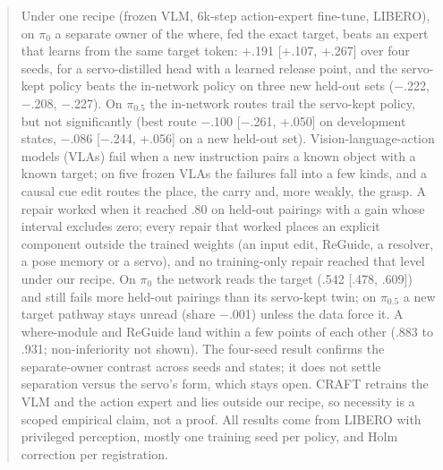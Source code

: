 \documentclass{article}
\newcommand{\mi}{$-$}
\newcommand{\pifive}{$\pi_{0.5}$}
\newcommand{\pizero}{$\pi_0$}
\begin{document}

\printAffiliationsAndNotice{}

\begin{abstract}
Under one recipe (frozen VLM, 6k-step action-expert fine-tune, LIBERO), on \pizero{} a separate owner of the where, fed the exact target, beats an expert that learns from the same target token: +.191 [+.107, +.267] over four seeds, for a servo-distilled head with a learned release point, and the servo-kept policy beats the in-network policy on three new held-out sets (\mi.222, \mi.208, \mi.227). On \pifive{} the in-network routes trail the servo-kept policy, but not significantly (best route \mi.100 [\mi.261, +.050] on development states, \mi.086 [\mi.244, +.056] on a new held-out set). Vision-language-action models (VLAs) fail when a new instruction pairs a known object with a known target; on five frozen VLAs the failures fall into a few kinds, and a causal cue edit routes the place, the carry and, more weakly, the grasp. A repair worked when it reached .80 on held-out pairings with a gain whose interval excludes zero; every repair that worked places an explicit component outside the trained weights (an input edit, ReGuide, a resolver, a pose memory or a servo), and no training-only repair reached that level under our recipe. On \pizero{} the network reads the target (.542 [.478, .609]) and still fails more held-out pairings than its servo-kept twin; on \pifive{} a new target pathway stays unread (share \mi.001) unless the data force it. A where-module and ReGuide land within a few points of each other (.883 to .931; non-inferiority not shown). The four-seed result confirms the separate-owner contrast across seeds and states; it does not settle separation versus the servo's form, which stays open. CRAFT retrains the VLM and the action expert and lies outside our recipe, so necessity is a scoped empirical claim, not a proof. All results come from LIBERO with privileged perception, mostly one training seed per policy, and Holm correction per registration.
\end{abstract}
\end{document}
